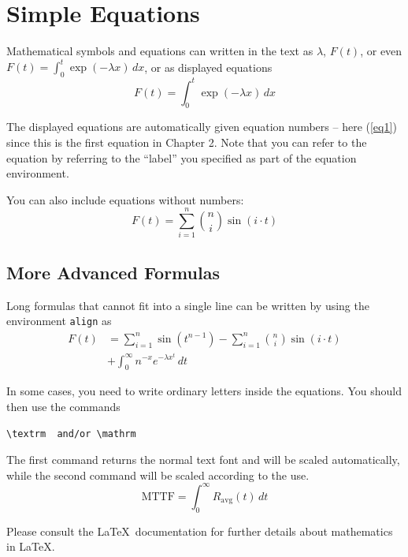 \section{Simple Equations}
Mathematical symbols and equations can written in the text as $\lambda$, $F(t)$, or even $F(t)=\int_0^t \exp(-\lambda x)\,dx$, or as displayed equations
\begin{equation}
F(t)=\int_0^t \exp(-\lambda x)\,dx
\label{eq1}
\end{equation}
\fi

The displayed equations are automatically given equation numbers -- here (\ref{eq1}) since this is the first equation in Chapter 2. Note that you can refer to the equation by referring to the ``label'' you specified as part of the equation environment.

You can also include equations without numbers:
\begin{equation*}
F(t)=\sum_{i=1}^n \binom{n}{i}\sin(i\cdot t)
\end{equation*}

\subsection*{More Advanced Formulas}
Long formulas that cannot fit into a single line can be written by using the environment \texttt{align} as
\begin{align}
F(t)&= \sum_{i=1}^n \sin(t^{n-1}) - \sum_{i=1}^n \binom{n}{i}\sin(i\cdot t) \\
      & + \int_0^\infty n^{-x} e^{-\lambda x^t}\,dt
\end{align}

In some cases, you need to write ordinary letters inside the equations. You should then use the commands 
\begin{verbatim}
\textrm  and/or \mathrm
\end{verbatim}
The first command returns the normal text font and will be scaled automatically, while the second command will be scaled according to the use.
\begin{equation*}
\textrm{MTTF}= \int_0^\infty R_\mathrm{avg}(t)\,dt
\end{equation*}



Please consult the \LaTeX\ documentation for further details about mathematics in \LaTeX.
